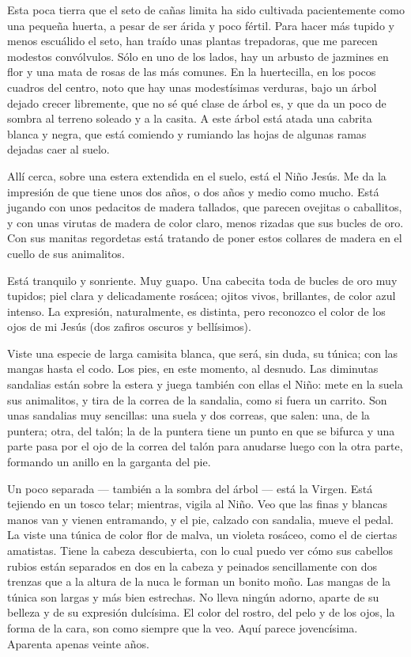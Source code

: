 \documentclass[12pt, twoside, openright]{book} %
\begin{document}
Esta poca tierra que el seto de cañas limita ha sido cultivada pacientemente como una pequeña huerta, a pesar de ser árida y poco fértil. Para hacer más tupido y menos escuálido el seto, han traído unas plantas trepadoras, que me parecen modestos convólvulos. Sólo en uno de los lados, hay un arbusto de jazmines en flor y una mata de rosas de las más comunes. En la huertecilla, en los pocos cuadros del centro, noto que hay unas modestísimas verduras, bajo un árbol dejado crecer libremente, que no sé qué clase de árbol es, y que da un poco de sombra al terreno soleado y a la casita. A este árbol está atada una cabrita blanca y negra, que está comiendo y rumiando las hojas de algunas ramas dejadas caer al suelo. 

Allí cerca, sobre una estera extendida en el suelo, está el Niño Jesús. Me da la impresión de que tiene unos dos años, o dos años y medio como mucho. Está jugando con unos pedacitos de madera tallados, que parecen ovejitas o caballitos, y con unas virutas de madera de color claro, menos rizadas que sus bucles de oro. Con sus manitas regordetas está tratando de poner estos collares de madera en el cuello de sus animalitos. 

Está tranquilo y sonriente. Muy guapo. Una cabecita toda de bucles de oro muy tupidos; piel clara y delicadamente rosácea; ojitos vivos, brillantes, de color azul intenso. La expresión, naturalmente, es distinta, pero reconozco el color de los ojos de mi Jesús (dos zafiros oscuros y bellísimos). 

Viste una especie de larga camisita blanca, que será, sin duda, su túnica; con las mangas hasta el codo. Los pies, en este momento, al desnudo. Las diminutas sandalias están sobre la estera y juega también con ellas el Niño: mete en la suela sus animalitos, y tira de la correa de la sandalia, como si fuera un carrito. Son unas sandalias muy sencillas: una suela y dos correas, que salen: una, de la puntera; otra, del talón; la de la puntera tiene un punto en que se bifurca y una parte pasa por el ojo de la correa del talón para anudarse luego con la otra parte, formando un anillo en la garganta del pie. 

Un poco separada — también a la sombra del árbol — está la Virgen. Está tejiendo en un tosco telar; mientras, vigila al Niño. Veo que las finas y blancas manos van y vienen entramando, y el pie, calzado con sandalia, mueve el pedal. La viste una túnica de color flor de malva, un violeta rosáceo, como el de ciertas amatistas. Tiene la cabeza descubierta, con lo cual puedo ver cómo sus cabellos rubios están separados en dos en la cabeza y peinados sencillamente con dos trenzas que a la altura de la nuca le forman un bonito moño. Las mangas de la túnica son largas y más bien estrechas. No lleva ningún adorno, aparte de su belleza y de su expresión dulcísima. El color del rostro, del pelo y de los ojos, la forma de la cara, son como siempre que la veo. Aquí parece jovencísima. Aparenta apenas veinte años. 
\end{document}
